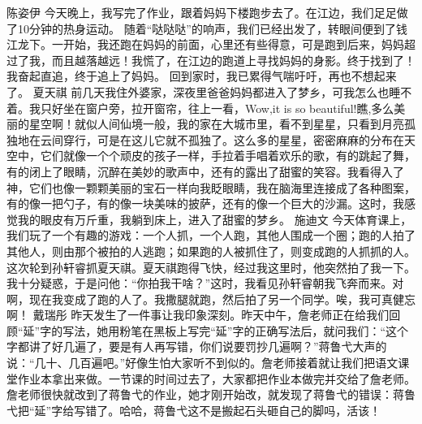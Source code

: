 {}陈姿伊\markdownRendererInterblockSeparator
{}今天晚上，我写完了作业，跟着妈妈下楼跑步去了。在江边，我们足足做了10分钟的热身运动。\markdownRendererInterblockSeparator
{}随着“哒哒哒”的响声，我们已经出发了，转眼间便到了钱江龙下。一开始，我还跑在妈妈的前面，心里还有些得意，可是跑到后来，妈妈超过了我，而且越落越远！我慌了，在江边的跑道上寻找妈妈的身影。终于找到了！我奋起直追，终于追上了妈妈。\markdownRendererInterblockSeparator
{}回到家时，我已累得气喘吁吁，再也不想起来了。\markdownRendererInterblockSeparator
{}\markdownRendererInterblockSeparator
{}夏天祺\markdownRendererInterblockSeparator
{}前几天我住外婆家，深夜里爸爸妈妈都进入了梦乡，可我怎么也睡不着。我只好坐在窗户旁，拉开窗帘，往上一看，Wow,it is so beautiful!瞧,多么美丽的星空啊！就似人间仙境一般，我的家在大城市里，看不到星星，只看到月亮孤独地在云间穿行，可是在这儿它就不孤独了。这么多的星星，密密麻麻的分布在天空中，它们就像一个个顽皮的孩子一样，手拉着手唱着欢乐的歌，有的跳起了舞，有的闭上了眼睛，沉醉在美妙的歌声中，还有的露出了甜蜜的笑容。我看得入了神，它们也像一颗颗美丽的宝石一样向我眨眼睛，我在脑海里连接成了各种图案，有的像一把勺子，有的像一块美味的披萨，还有的像一个巨大的沙漏。这时，我感觉我的眼皮有万斤重，我躺到床上，进入了甜蜜的梦乡。\markdownRendererInterblockSeparator
{}\markdownRendererInterblockSeparator
{}施迪文\markdownRendererInterblockSeparator
{}今天体育课上，我们玩了一个有趣的游戏：一个人抓，一个人跑，其他人围成一个圈；跑的人拍了其他人，则由那个被拍的人逃跑；如果跑的人被抓住了，则变成跑的人抓抓的人。这次轮到孙轩睿抓夏天祺。夏天祺跑得飞快，经过我这里时，他突然拍了我一下。我十分疑惑，于是问他：“你拍我干啥？”这时，我看见孙轩睿朝我飞奔而来。对啊，现在我变成了跑的人了。我撒腿就跑，然后拍了另一个同学。唉，我可真健忘啊！\markdownRendererInterblockSeparator
{}\markdownRendererInterblockSeparator
{}戴瑞彤\markdownRendererInterblockSeparator
{}昨天发生了一件事让我印象深刻。昨天中午，詹老师正在给我们回顾“延”字的写法，她用粉笔在黑板上写完“延”字的正确写法后，就问我们：“这个字都讲了好几遍了，要是有人再写错，你们说要罚抄几遍啊？”蒋鲁弋大声的说：“几十、几百遍吧。”好像生怕大家听不到似的。詹老师接着就让我们把语文课堂作业本拿出来做。一节课的时间过去了，大家都把作业本做完并交给了詹老师。詹老师很快就改到了蒋鲁弋的作业，她才刚开始改，就发现了蒋鲁弋的错误：蒋鲁弋把“延”字给写错了。哈哈，蒋鲁弋这不是搬起石头砸自己的脚吗，活该！\markdownRendererInterblockSeparator
{}\markdownRendererInterblockSeparator
